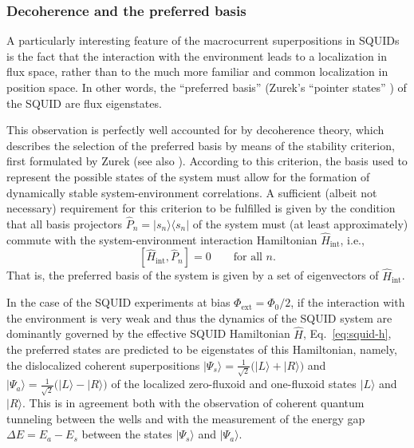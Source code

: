 \documentclass[twocolumn,aps,floatfix,amsmath,amssymb,showpacs,nofootinbib]{revtex4}
\newcommand{\be}{\begin{equation}} \newcommand{\ee}{\end{equation}}
\newcommand{\ket}[1]{\ensuremath{|{#1\rangle}}}
\newcommand{\ketbra}[2]{\ensuremath{|{#1 \rangle}{\langle #2}|}}
\begin{document}
\subsubsection{Decoherence and the preferred basis} \label{sec:squid-prefbasis}

A particularly interesting feature of the macrocurrent superpositions
in SQUIDs is the fact that the interaction with the environment leads
to a localization in flux space, rather than to the much more familiar
and common localization in position space. In other words, the
``preferred basis'' (Zurek's ``pointer states''
\cite{Zurek:1981:dd,Zurek:1982:tv}) of the SQUID are flux eigenstates.

This observation is perfectly well accounted for by decoherence
theory, which describes the selection of the preferred basis by means
of the stability criterion, first formulated by Zurek
\cite{Zurek:1981:dd} (see also
\cite{Zurek:1982:tv,Zurek:1993:pu,Zurek:1998:re,Zurek:2002:ii,Schlosshauer:2003:tv}).
According to this criterion, the basis used to represent the possible
states of the system must allow for the formation of dynamically
stable system-environment correlations.  A sufficient (albeit not
necessary) requirement for this criterion to be fulfilled is given by
the condition that all basis projectors $\widehat{P}_n =
\ketbra{s_n}{s_n}$ of the system must (at least approximately) commute
with the system-environment interaction Hamiltonian
$\widehat{H}_\text{int}$, i.e.,
%
\be \label{eq:commut}
[\widehat{H}_\text{int}, \widehat{P}_n] = 0 \qquad \text{for all $n$.}
\ee
%
That is, the preferred basis of the system is given by a set of
eigenvectors of $\widehat{H}_\text{int}$.
  
In the case of the SQUID experiments at bias $\Phi_\text{ext} =
\Phi_0/2$, if the interaction with the environment is very weak and thus
the dynamics of the SQUID system are dominantly governed by the
effective SQUID Hamiltonian $\widehat{H}$, Eq.~\eqref{eq:squid-h}, the
preferred states are predicted to be eigenstates of this Hamiltonian,
namely, the dislocalized coherent superpositions $\ket{\Psi_s} =
\frac{1}{\sqrt{2}} \bigl( \ket{L} + \ket{R} \bigr)$ and $\ket{\Psi_a}
= \frac{1}{\sqrt{2}} \bigl( \ket{L} - \ket{R} \bigr)$ of the localized
zero-fluxoid and one-fluxoid states $\ket{L}$ and $\ket{R}$. This is
in agreement both with the observation of coherent quantum tunneling
between the wells and with the measurement of the energy gap $\Delta E
= E_a - E_s$ between the states $\ket{\Psi_s}$ and $\ket{\Psi_a}$.
\end{document}
